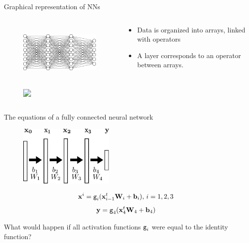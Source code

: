 \documentclass[xcolor=pdftex,dvipsnames,table,mathserif]{beamer}
\begin{document}
\begin{frame}{Graphical representation of NNs}

  \begin{columns}
    \begin{column}{.5\textwidth}
      \begin{figure}
        \includegraphics[height=3cm]{mini_reseau3_bis}
      \end{figure}
      \begin{figure}
        \includegraphics<2->[height=3cm]{nn_representation3}
      \end{figure}
    \end{column}

    \begin{column}{.5\textwidth}
      \begin{itemize}
      \item<2-> Data is organized into arrays, linked with operators
      \item<3-> A layer corresponds to an operator between arrays.
      \end{itemize}
    \end{column}
  \end{columns}

\end{frame}

\begin{frame}{The equations of a fully connected neural network}

  \begin{figure}
    \includegraphics[height=3cm]{nn_representation2}
  \end{figure}

  \begin{block}{}
    \[\mathbf{x}^i = \texttt{g}_i(\mathbf{x}_{i-1}^t \mathbf{W}_i + \mathbf{b}_i),\, i= 1, 2, 3 \]
    \[\mathbf{y} = \texttt{g}_4(\mathbf{x}_4^t \mathbf{W}_4 + \mathbf{b}_4)\]
  \end{block}

  \pause

  What would happen if all activation functions $\texttt{g}_i$ were equal to the identity function?

\end{frame}
\end{document}
